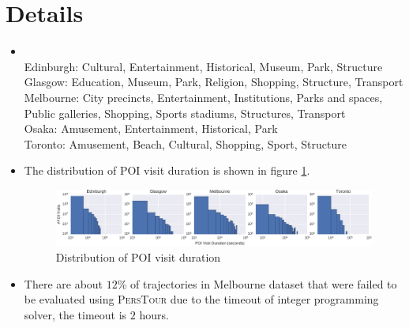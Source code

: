 \appendix
\section{Details}
\begin{itemize}
\item {} \\
      Edinburgh: Cultural, Entertainment, Historical, Museum, Park, Structure \\
      Glasgow: Education, Museum, Park, Religion, Shopping, Structure, Transport \\
      Melbourne: City precincts, Entertainment, Institutions, Parks and spaces, Public galleries, Shopping, 
                 Sports stadiums, Structures, Transport \\
      Osaka: Amusement, Entertainment, Historical, Park \\
      Toronto: Amusement, Beach, Cultural, Shopping, Sport, Structure 
\item The distribution of POI visit duration is shown in figure \ref{fig:duration}.
      \begin{figure}
      \includegraphics[width=\textwidth]{fig/visit_duration.pdf}
      \caption{Distribution of POI visit duration}
      \label{fig:duration}
      \end{figure}
\item There are about $12$\% of trajectories in Melbourne dataset that were failed to be evaluated 
      using \textsc{PersTour} due to the timeout of integer programming solver, the timeout is $2$ hours.
\end{itemize}
